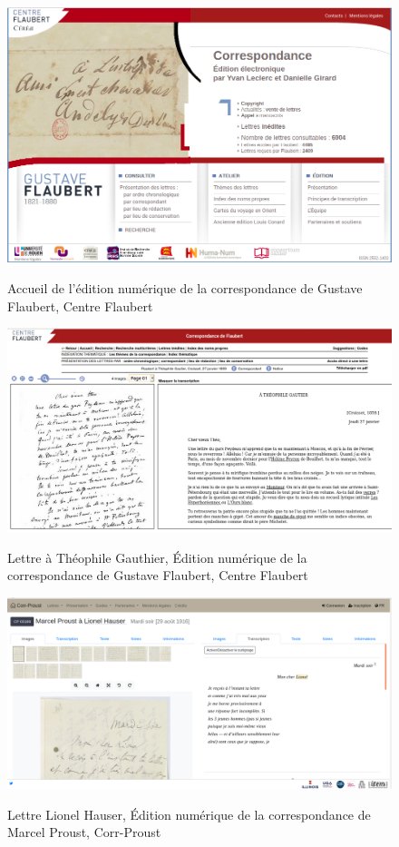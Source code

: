 \begin{figure}[H]
    \centering
    \caption{Accueil de l'édition numérique de la correspondance de Gustave Flaubert, Centre Flaubert}
    \includegraphics[width=16cm]{images/accueil_flaubert.png}
    \label{accueil_flaubert}
\end{figure}

\begin{figure}[ht]
    \centering
    \caption{Lettre à Théophile Gauthier, Édition numérique de la correspondance de Gustave Flaubert, Centre Flaubert}
    \includegraphics[width=16cm]{images/flaubert_lettre.png}
    \label{flaubert_lettre}
\end{figure}

\begin{figure}[H]
    \centering
    \caption{Lettre Lionel Hauser, Édition numérique de la correspondance de Marcel Proust, Corr-Proust}
    \includegraphics[width=16cm]{images/corr-proust_lettre.png}
    \label{corr-proust_lettre}
\end{figure}

